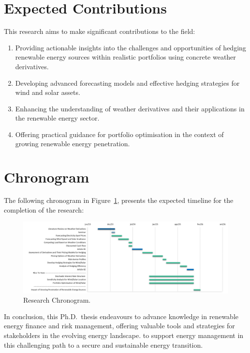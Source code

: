 \section{Expected Contributions}
    \label{sec:rs_expected-contributions}

    This research aims to make significant contributions to the field:

    \begin{enumerate}%
        \item Providing actionable insights into the challenges and opportunities of hedging renewable
            energy sources within realistic portfolios using concrete weather derivatives.
        \item Developing advanced forecasting models and effective hedging strategies for wind and solar assets.
        \item Enhancing the understanding of weather derivatives and their applications in the renewable energy sector.
        \item Offering practical guidance for portfolio optimisation in the context of growing
             renewable energy penetration.
    \end{enumerate}

\newpage

\section{Chronogram}
\label{sec:rs_chronogram}

    The following chronogram in Figure~\ref{fig:chronogram}, presents the expected timeline for the completion
    of the research:

    \begin{figure}[htbp]
        \centering
        \includegraphics[width=1\textwidth]{Images/CAT/chronogram.png}
        \caption{Research Chronogram.}
        \label{fig:chronogram}
    \end{figure}
%


In conclusion, this Ph.D.\ thesis endeavours to advance knowledge in renewable energy finance and risk management,
offering valuable tools and strategies for stakeholders in the evolving energy landscape.
to support energy management in this challenging path to a secure and sustainable energy transition.




